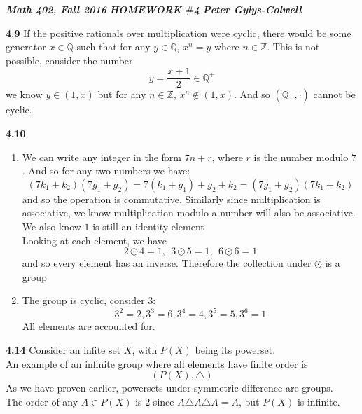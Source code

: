 \documentclass[12pt]{article}
\newenvironment{ques}{\vspace{2 ex}}{\vspace{2 ex}}
\theoremstyle{definition}
\begin{document}
\noindent \textit{\textbf{Math 402, Fall 2016}} \hspace{1.3cm}
\textit{\textbf{HOMEWORK $\#$4}} \hspace{1.3cm} \textit{\textbf{Peter
Gylys-Colwell}} 

\vspace{1cm}

\begin{ques}
	\textbf{4.9} 
		If the positive rationals over multiplication were cyclic,
		there would be some generator $x \in \mathbb{Q}$ such that for any $y \in
		\mathbb{Q}$, $x^n = y$ where $n \in \mathbb{Z}$. This is not
		possible, consider the number
		$$y = \frac{x + 1}{2} \in \mathbb{Q}^+$$
		we know $y \in (1,x)$ but for any $n \in \mathbb{Z}$, $x^n
		\notin (1,x)$. And so $(\mathbb{Q}^+, \cdot)$ cannot be cyclic.
\end{ques}

\begin{ques}
	\textbf{4.10}
		\begin{enumerate}
			\item  We can write any integer in the form $7n + r$,
				where $r$ is the number modulo $7$. And so for
				any two numbers we have:
				$$(7k_1 + k_2)(7g_1 + g_2) = 7(k_1 + g_1) + g_2
				+ k_2 =  (7g_1 + g_2)(7k_1 + k_2)$$
				and so the operation is commutative. Similarly
				since multiplication is associative, we know
				multiplication modulo a number will also be
				associative.\\
				We also know $1$ is still
				an identity element\\
				Looking at each element, we have 
				$$2 \odot 4 = 1,\ \ 3 \odot 5 = 1,\ \ 6 \odot 6 = 1$$
				and so every element has an inverse. Therefore
				the collection under $\odot$ is a group

			\item The group is cyclic, consider $3$:
				$$3^2 = 2, 3^3 = 6, 3^4 = 4, 3^5 = 5, 3^6 = 1$$
				All elements are accounted for.
		\end{enumerate}
		
\end{ques}

\begin{ques}
	\textbf{4.14}
		Consider an infite set $X$, with $P(X)$ being its powerset. \\
		An example of an infinite group where all elements have finite order is
		$$(P(X), \triangle)$$
		As we have proven earlier, powersets under symmetric difference are groups.\\
		The order of any $A \in P(X)$ is $2$ since $A \triangle A
		\triangle A = A$, but $P(X)$ is infinite.
\end{ques}
\end{document}
